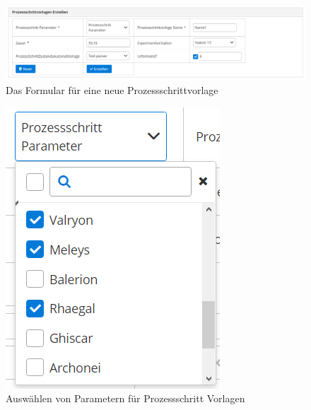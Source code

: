 \documentclass[enabledeprecatedfontcommands,fontsize=12pt,paper=a4,twoside]{scrartcl}
\begin{document}
\begin{figure}[h!]
\begin{center}
 \includegraphics[width=\textwidth]{screenshots/pk/prozessschrittvorlageformular.png}
  \caption{Das Formular für eine neue Prozessschrittvorlage}
  \label{fig:boat2}
\end{center}
\end{figure}

\begin{figure}[h!]
\begin{center}
 \includegraphics[width=\textwidth]{screenshots/pk/prozessschrittvorlageparameter.png}
  \caption{Auswählen von Parametern für Prozessschritt Vorlagen}
  \label{fig:boat2}
\end{center}
\end{figure}
\end{document}
